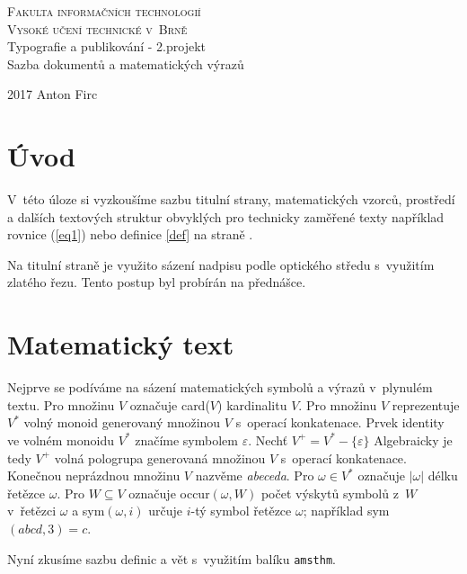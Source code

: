\documentclass[a4paper, 11pt]{article}
\theoremstyle{definition}
\theoremstyle{definition}
\begin{document}
\begin{center}
	{
		\textsc{\Huge Fakulta informačních technologií\\Vysoké učení technické v~Brně}\\
		\LARGE Typografie a publikování - 2.projekt\\
		Sazba dokumentů a matematických výrazů\\
	}
\end{center}
{\Large 2017 \hfill Anton Firc}
\newpage

\twocolumn
\sloppy
 \section*{Úvod} 
V~této úloze si vyzkoušíme sazbu titulní strany, matematických vzorců, prostředí a dalších textových struktur obvyklých pro technicky zaměřené texty například rovnice (\ref{eq1}) nebo definice \ref{def} na straně \pageref{def}.

Na titulní straně je využito sázení nadpisu podle optického středu s~využitím zlatého řezu. Tento postup byl probírán na přednášce.


\section{Matematický text}

Nejprve se podíváme na sázení matematických symbolů a výrazů v~plynulém textu. Pro množinu $V$ označuje card($V$) kardinalitu $V$.
Pro množinu $V$ reprezentuje $V^*$ volný monoid generovaný množinou $V$ s~operací konkatenace.
Prvek identity ve volném monoidu $V^*$ značíme symbolem $\varepsilon$.
Nechť $V^+ =V^* - \{\varepsilon\}$ Algebraicky je tedy $V^+$ volná pologrupa generovaná množinou $V$ s~operací konkatenace.
Konečnou neprázdnou množinu $V$ nazvěme \emph{abeceda}.
Pro $\omega \in V^*$ označuje $|\omega|$ délku řetězce $\omega$. Pro $W \subseteq V$ označuje occur$(\omega,W)$ počet výskytů symbolů z~$W$ v~řetězci $\omega$ a sym$(\omega,i)$ určuje $i$-tý symbol řetězce $\omega$; například sym$(abcd,3)=c$.

Nyní zkusíme sazbu definic a vět s~využitím balíku \texttt{amsthm}.
\end{document}
